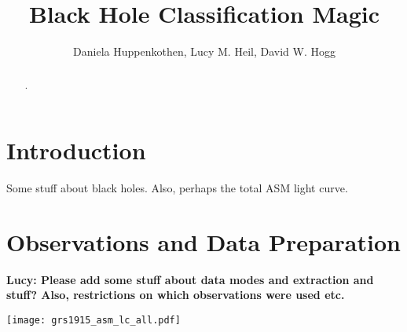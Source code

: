 \documentclass[12pt]{emulateapj}
\newcommand{\project}[1]{\textsl{#1}}
\newcommand{\rxte}{\project{RXTE}}
\begin{document}
\title{Black Hole Classification Magic}

\author{Daniela Huppenkothen, Lucy M. Heil, David W. Hogg}
 


\begin{abstract}
.

\end{abstract}


\section{Introduction}

Some stuff about black holes. Also, perhaps the total ASM light curve.

\section{Observations and Data Preparation}

{\bf Lucy: Please add some stuff about data modes and extraction and stuff? Also, restrictions on which observations were used etc.}

\begin{figure*}[htbp]
\begin{center}
\texttt{[image: grs1915\_asm\_lc\_all.pdf]}
\caption{\rxte\ All-Sky Monitor (ASM) light curve for the entire duration of the \rxte\ mission. Each panel covers $500$ days. Shown in blue is the ASM light curve. In green, the start points of the \rxte/PCA observations with high enough time resolution to be relevant for this analysis. The \rxte/PCA observations span the entire lifetime and provide a 
sample with high coverage in time, albeit with a bias toward active periods of the system.}
\label{fig:asm_total}
\end{center}
\end{figure*}
\end{document}
